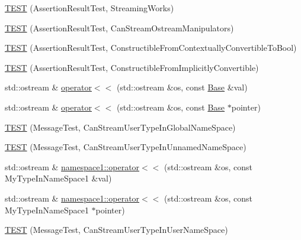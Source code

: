 \begin{DoxyCompactItemize}
\mbox{\hyperlink{googletest-master_2googletest_2test_2gtest__unittest_8cc_acdfdc68a5959b52a59f9dd0cccc3f390}{T\+E\+ST}} (Assertion\+Result\+Test, Streaming\+Works)
\item 
\mbox{\hyperlink{googletest-master_2googletest_2test_2gtest__unittest_8cc_a9f44af0752c3f08c932e2750905c6d79}{T\+E\+ST}} (Assertion\+Result\+Test, Can\+Stream\+Ostream\+Manipulators)
\item 
\mbox{\hyperlink{googletest-master_2googletest_2test_2gtest__unittest_8cc_a6c1aee92a8318b35de4f07970a737f5b}{T\+E\+ST}} (Assertion\+Result\+Test, Constructible\+From\+Contextually\+Convertible\+To\+Bool)
\item 
\mbox{\hyperlink{googletest-master_2googletest_2test_2gtest__unittest_8cc_a4e5c52db04c25d8718f584bf5f74c62a}{T\+E\+ST}} (Assertion\+Result\+Test, Constructible\+From\+Implicitly\+Convertible)
\item 
std\+::ostream \& \mbox{\hyperlink{googletest-master_2googletest_2test_2gtest__unittest_8cc_ab80209c07a91db303a9d415dc9bd4e81}{operator$<$$<$}} (std\+::ostream \&os, const \mbox{\hyperlink{class_base}{Base}} \&val)
\item 
std\+::ostream \& \mbox{\hyperlink{googletest-master_2googletest_2test_2gtest__unittest_8cc_ac4fc0177334a6fd32b81376c9a2a2dc6}{operator$<$$<$}} (std\+::ostream \&os, const \mbox{\hyperlink{class_base}{Base}} $\ast$pointer)
\item 
\mbox{\hyperlink{googletest-master_2googletest_2test_2gtest__unittest_8cc_a3cfb4c4e94683c4677706c53ab52fb8e}{T\+E\+ST}} (Message\+Test, Can\+Stream\+User\+Type\+In\+Global\+Name\+Space)
\item 
\mbox{\hyperlink{googletest-master_2googletest_2test_2gtest__unittest_8cc_ab9dfac778014c6214ff30da9c74cbffe}{T\+E\+ST}} (Message\+Test, Can\+Stream\+User\+Type\+In\+Unnamed\+Name\+Space)
\item 
std\+::ostream \& \mbox{\hyperlink{namespacenamespace1_a469f00dab6318267fb48fab73226ca95}{namespace1\+::operator$<$$<$}} (std\+::ostream \&os, const My\+Type\+In\+Name\+Space1 \&val)
\item 
std\+::ostream \& \mbox{\hyperlink{namespacenamespace1_a9be9cab39b3a33a012040d70e1c86949}{namespace1\+::operator$<$$<$}} (std\+::ostream \&os, const My\+Type\+In\+Name\+Space1 $\ast$pointer)
\item 
\mbox{\hyperlink{googletest-master_2googletest_2test_2gtest__unittest_8cc_ac87850465b99bd7121b521b2da5966f4}{T\+E\+ST}} (Message\+Test, Can\+Stream\+User\+Type\+In\+User\+Name\+Space)
\item 

\end{DoxyCompactItemize}
